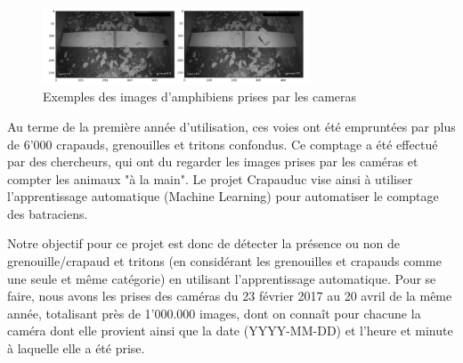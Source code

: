 \newpage

\begin{figure}[!htb]
    \centering
    \includegraphics[width=300px]{images/introduction_crapauduc_exemple_prise_camera.png}
    \caption{Exemples des images d'amphibiens prises par les cameras}
    \label{fig:Exemples des images d'amphibiens prises par les cameras}
\end{figure}

 Au terme de la première année d'utilisation, ces voies ont été empruntées par plus de 6'000 crapauds, grenouilles et tritons confondus. Ce comptage a été effectué par des chercheurs, qui ont du regarder les images prises par les caméras et compter les animaux "à la main". Le projet Crapauduc vise ainsi à utiliser l'apprentissage automatique (Machine Learning) pour automatiser le comptage des batraciens. \newline

Notre objectif pour ce projet est donc de détecter la présence ou non de grenouille/crapaud et tritons (en considérant les grenouilles et crapauds comme une seule et même catégorie) en utilisant l'apprentissage automatique. Pour se faire, nous avons les prises des caméras du 23 février 2017 au 20 avril de la même année, totalisant près de 1'000.000 images, dont on connaît pour chacune la caméra dont elle provient ainsi que la date (YYYY-MM-DD) et l'heure et minute à laquelle elle a été prise.
